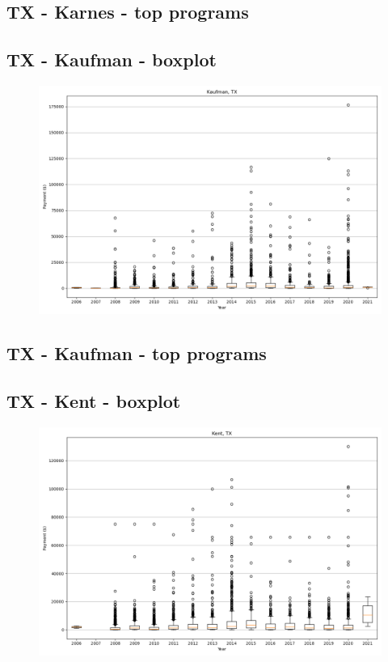 \subsection*{TX - Karnes - top programs}

\newpage
\subsection*{TX - Kaufman - boxplot}
\begin{figure}[h]
\centering
\includegraphics[width=7in]{../output/boxplots/counties/Kaufman-TX_boxplot.png}
\end{figure}


\subsection*{TX - Kaufman - top programs}

\newpage
\subsection*{TX - Kent - boxplot}
\begin{figure}[h]
\centering
\includegraphics[width=7in]{../output/boxplots/counties/Kent-TX_boxplot.png}
\end{figure}


